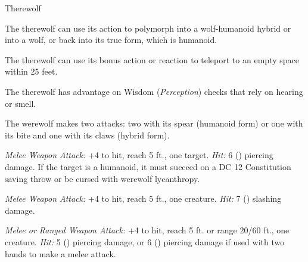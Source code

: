\documentclass[10pt,twoside,twocolumn,openany,nodeprecatedcode]{dndbook}
\begin{document}
\begin{DndMonster}[width=\textwidth  + 8pt]{Therewolf}

\DndMonsterBasics[armor-class = {11 in humanoid form, 12 ( natural armor) in wolf or hybrid form}, hit-points  = {\DndDice{6d8 + 12}}, speed = {walk 30 ft. (40 ft. in wolf form)}]
\DndMonsterAbilityScores[str = 15,dex = 13,con = 14,int = 10,wis = 11,cha = 10]
\DndMonsterDetails[skills = {\textit{Perception} +4}, languages = {Common (can't speak in wolf form)}, challenge = {3}]
\begin{multicols}{2}
The therewolf can use its action to polymorph into a wolf-humanoid hybrid or into a wolf, or back into its true form, which is humanoid.

The therewolf can use its bonus action or reaction to teleport to an empty space within 25 feet.

The therewolf has advantage on Wisdom (\textit{Perception}) checks that rely on hearing or smell.

The werewolf makes two attacks: two with its spear (humanoid form) or one with its bite and one with its claws (hybrid form).

\textsl{Melee Weapon Attack:} +4 to hit, reach 5 ft., one target. \textit{Hit:} 6 () piercing damage. If the target is a humanoid, it must succeed on a DC 12 Constitution saving throw or be cursed with werewolf lycanthropy.

\textsl{Melee Weapon Attack:} +4 to hit, reach 5 ft., one creature. \textit{Hit:} 7 () slashing damage.

\textsl{Melee or Ranged Weapon Attack:} +4 to hit, reach 5 ft. or range 20/60 ft., one creature. \textit{Hit:} 5 () piercing damage, or 6 () piercing damage if used with two hands to make a melee attack.

\end{multicols}

\end{DndMonster}
\end{document}
